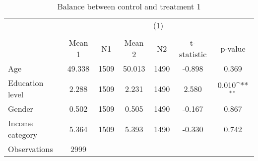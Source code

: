 \begin{table}[htbp]\centering
\def\sym#1{\ifmmode^{#1}\else\(^{#1}\)\fi}
\caption{Balance between control and treatment 1}
\begin{tabular}{l*{1}{cccccc}}
\hline\hline
                    &\multicolumn{6}{c}{(1)}                                                               \\
                    &\multicolumn{6}{c}{}                                                                  \\
                    &      Mean 1&          N1&      Mean 2&          N2& t-statistic&     p-value         \\
\hline
Age                 &      49.338&        1509&      50.013&        1490&      -0.898&       0.369         \\
Education level     &       2.288&        1509&       2.231&        1490&       2.580&       0.010\sym{**} \\
Gender              &       0.502&        1509&       0.505&        1490&      -0.167&       0.867         \\
Income category     &       5.364&        1509&       5.393&        1490&      -0.330&       0.742         \\
\hline
Observations        &        2999&            &            &            &            &                     \\
\hline\hline
\end{tabular}
\end{table}
